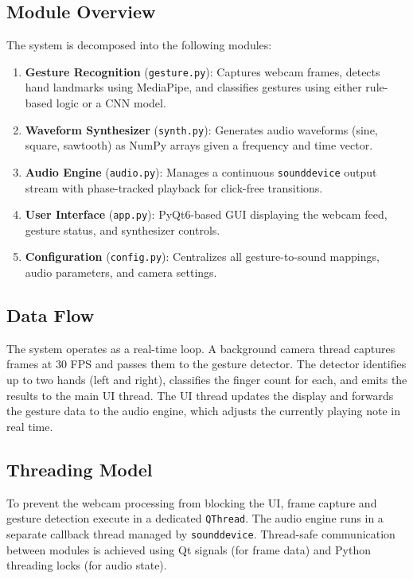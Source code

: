 \documentclass[conference]{IEEEtran}
\begin{document}
\subsection{Module Overview}

The system is decomposed into the following modules:

\begin{enumerate}
\item \textbf{Gesture Recognition} (\texttt{gesture.py}): Captures webcam frames, detects hand landmarks using MediaPipe, and classifies gestures using either rule-based logic or a CNN model.
\item \textbf{Waveform Synthesizer} (\texttt{synth.py}): Generates audio waveforms (sine, square, sawtooth) as NumPy arrays given a frequency and time vector.
\item \textbf{Audio Engine} (\texttt{audio.py}): Manages a continuous \texttt{sounddevice} output stream with phase-tracked playback for click-free transitions.
\item \textbf{User Interface} (\texttt{app.py}): PyQt6-based GUI displaying the webcam feed, gesture status, and synthesizer controls.
\item \textbf{Configuration} (\texttt{config.py}): Centralizes all gesture-to-sound mappings, audio parameters, and camera settings.
\end{enumerate}

\subsection{Data Flow}

The system operates as a real-time loop. A background camera thread captures frames at 30 FPS and passes them to the gesture detector. The detector identifies up to two hands (left and right), classifies the finger count for each, and emits the results to the main UI thread. The UI thread updates the display and forwards the gesture data to the audio engine, which adjusts the currently playing note in real time.

\subsection{Threading Model}

To prevent the webcam processing from blocking the UI, frame capture and gesture detection execute in a dedicated \texttt{QThread}. The audio engine runs in a separate callback thread managed by \texttt{sounddevice}. Thread-safe communication between modules is achieved using Qt signals (for frame data) and Python threading locks (for audio state).
\end{document}
